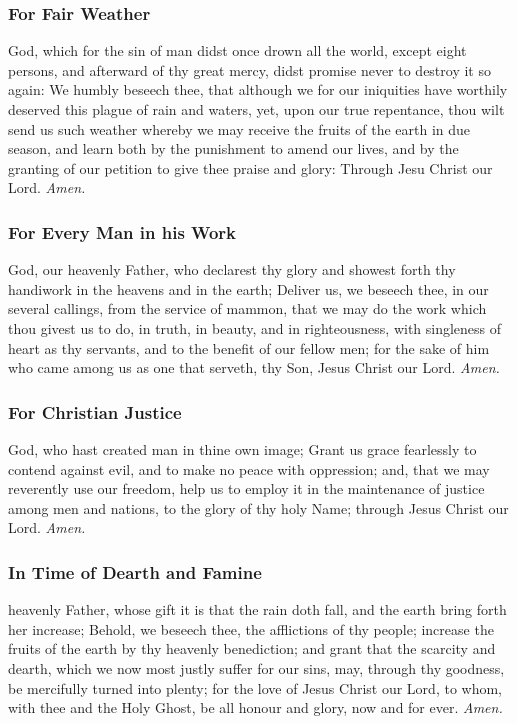 \subsubsection{For Fair Weather}
 God, which for the sin of man didst once drown all the world, except eight persons, and afterward of thy great mercy, didst promise never to destroy it so again: We humbly beseech thee, that although we for our iniquities have worthily deserved this plague of rain and waters, yet, upon our true repentance, thou wilt send us such weather whereby we may receive the fruits of the earth in due season, and learn both by the punishment to amend our lives, and by the granting of our petition to give thee praise and glory: Through Jesu Christ our Lord. \textit{Amen.}

\subsubsection{For Every Man in his Work}
 God, our heavenly Father, who declarest thy glory and showest forth thy handiwork in the heavens and in the earth; Deliver us, we beseech thee, in our several callings, from the service of mammon, that we may do the work which thou givest us to do, in truth, in beauty, and in righteousness, with singleness of heart as thy servants, and to the benefit of our fellow men; for the sake of him who came among us as one that serveth, thy Son, Jesus Christ our Lord. \textit{Amen.}

\subsubsection{For Christian Justice}
 God, who hast created man in thine own image; Grant us grace fearlessly to contend against evil, and to make no peace with oppression; and, that we may reverently use our freedom, help us to employ it in the maintenance of justice among men and nations, to the glory of thy holy Name; through Jesus Christ our Lord. \textit{Amen.}

\subsubsection{In Time of Dearth and Famine}
 heavenly Father, whose gift it is that the rain doth fall, and the earth bring forth her increase; Behold, we beseech thee, the afflictions of thy people; increase the fruits of the earth by thy heavenly benediction; and grant that the scarcity and dearth, which we now most justly suffer for our sins, may, through thy goodness, be mercifully turned into plenty; for the love of Jesus Christ our Lord, to whom, with thee and the Holy Ghost, be all honour and glory, now and for ever. \textit{Amen.}

